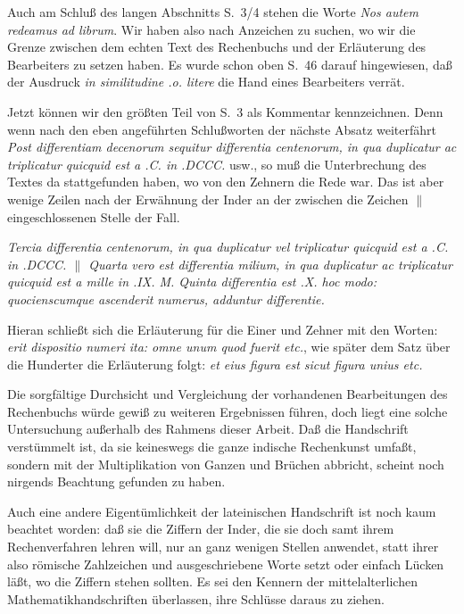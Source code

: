 \documentclass[11pt,a4paper]{article}
\begin{document}
Auch am Schlu\ss{} des langen Abschnitts S.\ 3/4 stehen die Worte \textit{Nos autem redeamus ad librum}. Wir haben also nach Anzeichen zu suchen, wo wir die Grenze zwischen dem echten Text des Rechenbuchs und der Erl\"auterung des Bearbeiters zu setzen haben. Es wurde schon oben S.\ 46 darauf hingewiesen, da\ss{} der Ausdruck \textit{in similitudine .o. litere} die Hand eines Bearbeiters verr\"at.

Jetzt k\"onnen wir den gr\"o\ss{}ten Teil von S.\ 3 als Kommentar kennzeichnen. Denn wenn nach den eben angef\"uhrten Schlu\ss{}worten der n\"achste Absatz weiterf\"ahrt \textit{Post differentiam decenorum sequitur differentia centenorum, in qua duplicatur ac triplicatur quicquid est a .C. in .DCCC.} usw., so mu\ss{} die Unterbrechung des Textes da stattgefunden haben, wo von den Zehnern die Rede war. Das ist aber wenige Zeilen nach der Erw\"ahnung der Inder an der zwischen die Zeichen $\|$ eingeschlossenen Stelle der Fall.

\textit{Tercia differentia centenorum, in qua duplicatur vel triplicatur quicquid est a .C. in .DCCC. $\|$ Quarta vero est differentia milium, in qua duplicatur ac triplicatur quicquid est a mille in .IX. M. Quinta differentia est .X. hoc modo: quocienscumque ascenderit numerus, adduntur differentie.}

Hieran schlie\ss{}t sich die Erl\"auterung f\"ur die Einer und Zehner mit den Worten: \textit{erit dispositio numeri ita: omne unum quod fuerit etc.}, wie sp\"ater dem Satz \"uber die Hunderter die Erl\"auterung folgt: \textit{et eius figura est sicut figura unius etc.}

Die sorgf\"altige Durchsicht und Vergleichung der vorhandenen Bearbeitungen des Rechenbuchs w\"urde gewi\ss{} zu weiteren Ergebnissen f\"uhren, doch liegt eine solche Untersuchung au\ss{}erhalb des Rahmens dieser Arbeit. Da\ss{} die Handschrift verst\"ummelt ist, da sie keineswegs die ganze indische Rechenkunst umfa\ss{}t, sondern mit der Multiplikation von Ganzen und Br\"uchen abbricht, scheint noch nirgends Beachtung gefunden zu haben.

Auch eine andere Eigent\"umlichkeit der lateinischen Handschrift ist noch kaum beachtet worden: da\ss{} sie die Ziffern der Inder, die sie doch samt ihrem Rechenverfahren lehren will, nur an ganz wenigen Stellen anwendet, statt ihrer also r\"omische Zahlzeichen und ausgeschriebene Worte setzt oder einfach L\"ucken l\"a\ss{}t, wo die Ziffern stehen sollten. Es sei den Kennern der mittelalterlichen Mathematikhandschriften \"uberlassen, ihre Schl\"usse daraus zu ziehen.
\end{document}
